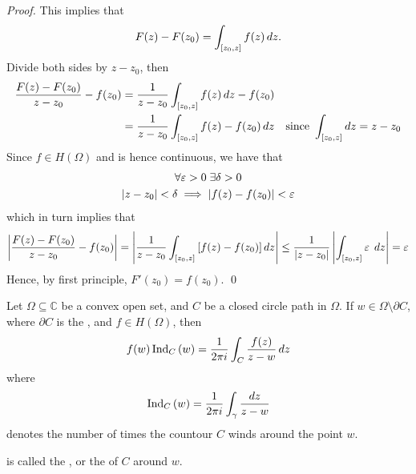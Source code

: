 \documentclass[notoc,notitlepage]{tufte-book}
\begin{document}
\begin{proof}
	This implies that
	\begin{equation*}
		F(z) - F(z_0) = \int_{[z_0, z]} f(z) \dif{z}.
	\end{equation*}
	Divide both sides by $z - z_0$, then
	\begin{align*}
		\frac{F(z) - F(z_0)}{z - z_0} - f(z_0)
			&= \frac{1}{z - z_0} \int_{[z_0, z]} f(z) \dif{z} - f(z_0) \\
			&= \frac{1}{z - z_0} \int_{[z_0, z]} f(z) - f(z_0) \dif{z} \quad \text{since } \int_{[z_0, z]} \dif{z} = z - z_0
	\end{align*}
	Since $f \in H(\Omega)$ and is hence continuous, we have that
	\begin{gather*}
		\forall \epsilon > 0 \; \exists \delta > 0 \\
		\abs{z - z_0} < \delta \implies \abs{f(z) - f(z_0)} < \epsilon
	\end{gather*}
	which in turn implies that
	\begin{equation*}
		\abs{\frac{F(z) - F(z_0)}{z - z_0} - f(z_0)} = \abs{\frac{1}{z - z_0} \int_{[z_0, z]} \left[f(z) - f(z_0)\right] \dif{z}} \leq \frac{1}{\abs{z - z_0}} \abs{\int_{[z_0, z]} \epsilon \; \dif{z}} = \epsilon
	\end{equation*}
	Hence, by first principle, $F'(z_0) = f(z_0)$. \qed
\end{proof}

\begin{thm}\label{thm:cauchy_s_integral_formula_1}
  Let $\Omega \subseteq \mathbb{C}$ be a convex open set, and $C$ be a closed circle path in $\Omega$. If $w \in \Omega \setminus \partial C$, where $\partial C$ is the , and $f \in H(\Omega)$, then
  \begin{equation*}
  	f(w) \ind{w}{C} = \frac{1}{2 \pi i} \int_{C} \frac{f(z)}{z - w} \dif{z}
  \end{equation*}
  where
  \begin{equation*}
  	\ind{w}{C} = \frac{1}{2 \pi i} \int_{\gamma} \frac{\dif{z}}{z - w}
  \end{equation*}
  denotes the number of times the countour $C$ winds around the point $w$.

  \begin{marginfigure}
  \end{marginfigure}
  is called the , or the  of $C$ around $w$.
\end{thm}
\end{document}
